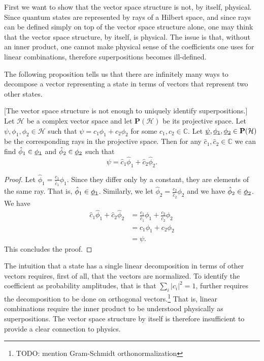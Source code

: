 \documentclass[10pt,twocolumn, nofootinbib]{revtex4-2}
\begin{document}
First we want to show that the vector space structure is not, by itself, physical. Since quantum states are represented by rays of a Hilbert space, and since rays can be defined simply on top of the vector space structure alone, one may think that the vector space structure, by itself, is physical. The issue is that, without an inner product, one cannot make physical sense of the coefficients one uses for linear combinations, therefore superpositions becomes ill-defined.

The following proposition tells us that there are infinitely many ways to decompose a vector representing a state in terms of vectors that represent two other states.
\begin{prop}\label{vector_insufficient}[The vector space structure is not enough to uniquely identify superpositions.] Let $\mathcal{H}$ be a complex vector space and let $\textbf{P}(\mathcal{H})$ be its projective space. Let $\psi, \phi_1, \phi_2 \in \mathcal{H}$ such that $\psi = c_1 \phi_1 + c_2 \phi_2$ for some $c_1, c_2 \in \mathbb{C}$. Let $\underbar{$\psi$}, \underbar{$\phi_1$}, \underbar{$\phi_2$} \in \textbf{P}(\mathcal{H})$ be the corresponding rays in the projective space. Then for any $\hat{c}_1, \hat{c}_2 \in \mathbb{C}$ we can find $\hat{\phi}_1 \in \underbar{$\phi_1$}$ and $\hat{\phi}_2 \in \underbar{$\phi_2$}$ such that
$$\psi = \hat{c}_1 \hat{\phi}_1 + \hat{c}_2 \hat{\phi}_2.$$
\end{prop}

\begin{proof}
Let $\hat{\phi}_1 = \frac{c_1}{\hat{c}_1} \phi_1$. Since they differ only by a constant, they are elements of the same ray. That is, $\hat{\phi}_1 \in \underbar{$\phi_1$}$. Similarly, we let $\hat{\phi}_2 = \frac{c_2}{\hat{c}_2} \phi_2$ and we have $\hat{\phi}_2 \in \underbar{$\phi_2$}$. We have
\begin{equation}
\begin{aligned}
	\hat{c}_1 \hat{\phi}_1 + \hat{c}_2 \hat{\phi}_2 &= \frac{c_1}{\hat{c}_1} \phi_1 + \frac{c_2}{\hat{c}_2} \phi_2 \\
	&= c_1 \phi_1 + c_2 \phi_2 \\ 
	&= \psi.
	\end{aligned}
\end{equation}
This concludes the proof.
\end{proof}

The intuition that a state has a single linear decomposition in terms of other vectors requires, first of all, that the vectors are normalized. To identify the coefficient as probability amplitudes, that is that $\sum_i |c_i|^2 = 1$, further requires the decomposition to be done on orthogonal vectors.\footnote{TODO: mention Gram-Schmidt orthonormalization} That is, linear combinations require the inner product to be understood physically as superpositions. The vector space structure by itself is therefore insufficient to provide a clear connection to physics.
\end{document}
